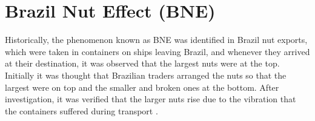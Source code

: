 \chapter{Brazil Nut Effect (BNE)}
\label{chap:BNE}

    Historically, the phenomenon known as BNE was identified in Brazil nut exports, which were taken in containers on ships leaving Brazil, and whenever they arrived at their destination, it was observed that the largest nuts were at the top. Initially it was thought that Brazilian traders arranged the nuts so that the largest were on top and the smaller and broken ones at the bottom. After investigation, it was verified that the larger nuts rise due to the vibration that the containers suffered during transport \cite{Caio-Tese}. 


